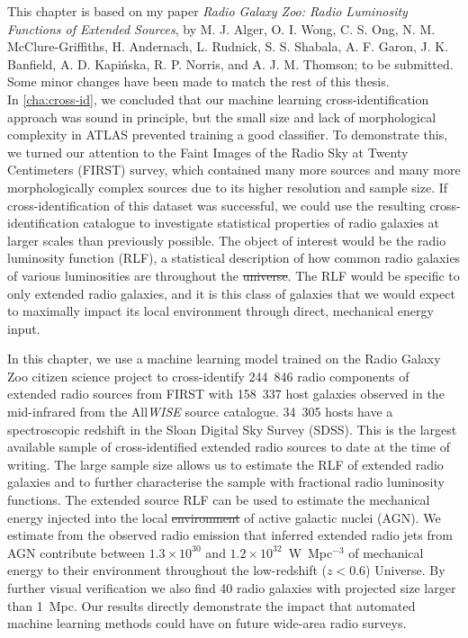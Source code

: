 \documentclass[11pt, a4paper]{book}
\newcommand{\ncomponents}{244~846}
\newcommand{\nsources}{158~337}
\newcommand{\nsourceszsp}{34~305}
\newcommand{\nnewgiants}{40}
\providecommand{\DIFaddtex}[1]{{\protect\color{blue}\uwave{#1}}} %
\providecommand{\DIFdeltex}[1]{{\protect\color{red}\sout{#1}}}                      %
\providecommand{\DIFaddbegin}{} %
\providecommand{\DIFaddend}{} %
\providecommand{\DIFdelbegin}{} %
\providecommand{\DIFdelend}{} %
\providecommand{\DIFadd}[1]{\texorpdfstring{\DIFaddtex{#1}}{#1}} %
\providecommand{\DIFdel}[1]{\texorpdfstring{\DIFdeltex{#1}}{}} %
\newcommand{\DIFscaledelfig}{0.5}
\newlength{\DIFdelgraphicswidth} %
\newlength{\DIFdelgraphicsheight} %
\newcommand{\DIFaddincludegraphics}[2][]{{\color{blue}\fbox{\DIFOincludegraphics[#1]{#2}}}} %
\newcommand{\DIFdelincludegraphics}[2][]{%
\sbox{\DIFdelgraphicsbox}{\DIFOincludegraphics[#1]{#2}}%
\settoboxwidth{\DIFdelgraphicswidth}{\DIFdelgraphicsbox} %
\settoboxtotalheight{\DIFdelgraphicsheight}{\DIFdelgraphicsbox} %
\scalebox{\DIFscaledelfig}{%
\parbox[b]{\DIFdelgraphicswidth}{\usebox{\DIFdelgraphicsbox}\\[-\baselineskip] \rule{\DIFdelgraphicswidth}{0em}}\llap{\resizebox{\DIFdelgraphicswidth}{\DIFdelgraphicsheight}{%
\setlength{\unitlength}{\DIFdelgraphicswidth}%
\begin{picture}(1,1)%
\thicklines\linethickness{2pt} %
{\color[rgb]{1,0,0}\put(0,0){\framebox(1,1){}}}%
{\color[rgb]{1,0,0}\put(0,0){\line( 1,1){1}}}%
{\color[rgb]{1,0,0}\put(0,1){\line(1,-1){1}}}%
\end{picture}%
}\hspace*{3pt}}} %
} %
\DeclareRobustCommand{\DIFaddbegin}{\DIFOaddbegin \let\includegraphics\DIFaddincludegraphics} %
\DeclareRobustCommand{\DIFaddend}{\DIFOaddend \let\includegraphics\DIFOincludegraphics} %
\DeclareRobustCommand{\DIFdelbegin}{\DIFOdelbegin \let\includegraphics\DIFdelincludegraphics} %
\DeclareRobustCommand{\DIFdelend}{\DIFOaddend \let\includegraphics\DIFOincludegraphics} %
\begin{document}
This chapter is based on my paper \emph{Radio Galaxy Zoo: Radio Luminosity Functions of Extended Sources}, by M. J. Alger, O. I. Wong, C. S. Ong, N. M. McClure-Griffiths, H. Andernach, L. Rudnick, S. S. Shabala, A. F. Garon, J. K. Banfield, A. D. Kapi\'nska, R. P. Norris, and A. J. M. Thomson; to be submitted. Some minor changes have been made to match the rest of this thesis.\\

In \autoref{cha:cross-id}, we concluded that our machine learning cross-identification approach was sound in principle, but the small size and lack of morphological complexity in ATLAS prevented training a good classifier. To demonstrate this, we turned our attention to the Faint Images of the Radio Sky at Twenty Centimeters (FIRST) survey, which contained many more sources and many more morphologically complex sources due to its higher resolution and sample size. If cross-identification of this dataset was successful, we could use the resulting cross-identification catalogue to investigate statistical properties of radio galaxies at larger scales than previously possible. The object of interest would be the radio luminosity function (RLF), a statistical description of how common radio galaxies of various luminosities are throughout the \DIFdelbegin \DIFdel{universe}\DIFdelend \DIFaddbegin \DIFadd{Universe}\DIFaddend . The RLF would be specific to only extended radio galaxies, and it is this class of galaxies that we would expect to maximally impact its local environment through direct, mechanical energy input.

In this chapter, we use a machine learning model trained on the Radio Galaxy Zoo citizen science project to cross-identify \ncomponents{} radio components of extended radio sources from FIRST with \nsources{} host galaxies observed in the mid-infrared from the All\emph{WISE} source catalogue. \nsourceszsp{} hosts have a spectroscopic redshift in the Sloan Digital Sky Survey (SDSS). This is the largest available sample of cross-identified extended radio sources to date at the time of writing. The large sample size allows us to estimate the RLF of extended radio galaxies and to further characterise the sample with fractional radio luminosity functions. The extended source RLF can be used to estimate the mechanical energy injected into the local \DIFdelbegin \DIFdel{environment }\DIFdelend \DIFaddbegin \DIFadd{environments }\DIFaddend of active galactic nuclei (AGN). We estimate from the observed radio emission that inferred extended radio jets from AGN contribute between $1.3 \times 10^{30}$ and $1.2 \times 10^{32}$~W~Mpc$^{-3}$ of mechanical energy to their environment throughout the low-redshift ($z < 0.6$) Universe. By further visual verification we also find \nnewgiants{} radio galaxies with projected size larger than 1~Mpc. Our results directly demonstrate the impact that automated machine learning methods could have on future wide-area radio surveys.
\end{document}
